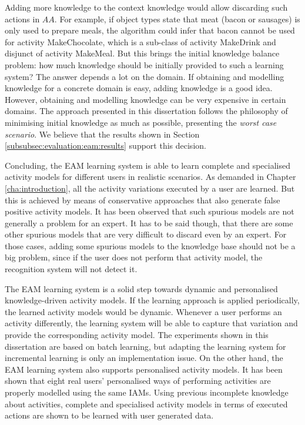 Adding more knowledge to the context knowledge would allow discarding such actions in $AA$. For example, if object types state that meat (bacon or sausages) is only used to prepare meals, the algorithm could infer that bacon cannot be used for activity MakeChocolate, which is a sub-class of activity MakeDrink and disjunct of activity MakeMeal. But this brings the initial knowledge balance problem: how much knowledge should be initially provided to such a learning system? The answer depends a lot on the domain. If obtaining and modelling knowledge for a concrete domain is easy, adding knowledge is a good idea. However, obtaining and modelling knowledge can be very expensive in certain domains. The approach presented in this dissertation follows the philosophy of minimising initial knowledge as much as possible, presenting the \textit{worst case scenario}. We believe that the results shown in Section \ref{subsubsec:evaluation:eam:results} support this decision. 

Concluding, the EAM learning system is able to learn complete and specialised activity models for different users in realistic scenarios. As demanded in Chapter \ref{cha:introduction}, all the activity variations executed by a user are learned. But this is achieved by means of conservative approaches that also generate false positive activity models. It has been observed that such spurious models are not generally a problem for an expert. It has to be said though, that there are some other spurious models that are very difficult to discard even by an expert. For those cases, adding some spurious models to the knowledge base should not be a big problem, since if the user does not perform that activity model, the recognition system will not detect it. 

The EAM learning system is a solid step towards dynamic and personalised knowledge-driven activity models. If the learning approach is applied periodically, the learned activity models would be dynamic. Whenever a user performs an activity differently, the learning system will be able to capture that variation and provide the corresponding activity model. The experiments shown in this dissertation are based on batch learning, but adapting the learning system for incremental learning is only an implementation issue. On the other hand, the EAM learning system also supports personalised activity models. It has been shown that eight real users' personalised ways of performing activities are properly modelled using the same IAMs. Using previous incomplete knowledge about activities, complete and specialised activity models in terms of executed actions are shown to be learned with user generated data.